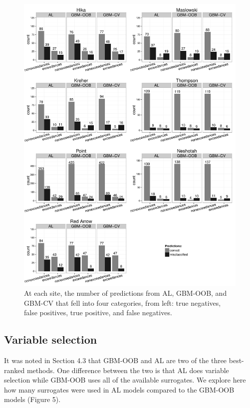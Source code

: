 \documentclass[authoryear,review, 12pt]{elsarticle}
\begin{document}
\begin{figure}
\includegraphics[width=\textwidth]{fig4/truepos.pdf}
\caption{At each site, the number of predictions from AL, GBM-OOB, and
GBM-CV that fell into four categories, from left: true negatives, false
positives, true positive, and false negatives.}
\end{figure}

\subsection{Variable selection}\label{covariate-selection}

It was noted in Section 4.3 that GBM-OOB and AL are two of the three
best-ranked methods. One difference between the two is that AL does
variable selection while GBM-OOB uses all of the available surrogates.
We explore here how many surrogates were used in AL models compared to
the GBM-OOB models (Figure 5).
\end{document}
